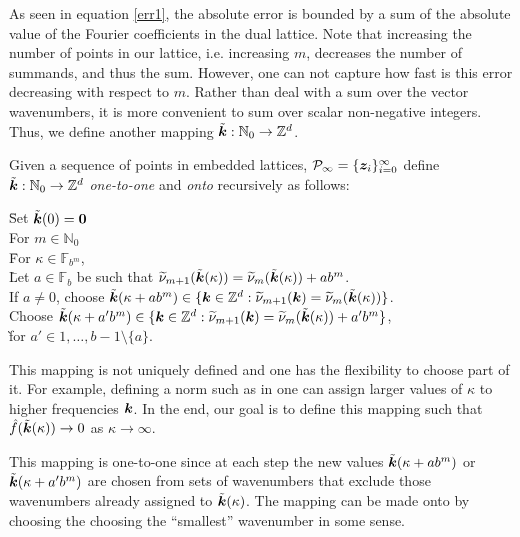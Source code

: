 \documentclass[graybox]{svmult}
\newcommand{\Z}{\mathbb{Z}} %
\newcommand{\N}{\mathbb{N}} %
\newcommand{\F}{\mathbb{F}} %
\newcommand{\bszero}{\boldsymbol{0}} %
\newcommand{\bsz}{\boldsymbol{z}}    %
\begin{document}
As seen in equation \eqref{err1}, the absolute error is bounded by a sum of the absolute value of the Fourier coefficients in the dual lattice. Note that increasing the number of points in our lattice, i.e. increasing $m$, decreases the number of summands, and thus the sum. However, one can not capture how fast is this error decreasing with respect to $m$.  Rather than deal with a sum over the vector wavenumbers, it is more convenient to sum over scalar non-negative integers.  Thus, we define another mapping $\tvk: \N_0 \to \Z^d$.

\begin{definition} \label{wavenummapdef} Given a sequence of points in embedded lattices, $\cp_{\infty} = \{\bsz_i\}_{i=0}^{\infty}$ define $\tvk: \N_0 \to \Z^d$ \emph{one-to-one} and \emph{onto} recursively as follows:
\begin{tabbing}
\hspace{0.5cm} \= Set $\tvk(0)=\bszero$ \+ \\
For $m\in \N_0$ \\
\hspace{0.3cm} \= For $\kappa \in \F_{b^m}$,  \+ \\
\hspace{0.3cm} \= Let $a\in \F_b$ be such that $\widetilde{\nu}_{m+1}(\tilde{\boldsymbol{k}}(\kappa))= \widetilde{\nu}_{m}(\tilde{\boldsymbol{k}}(\kappa)) + ab^m$. \+ \\
If $a\ne 0$, choose $\tvk(\kappa+a b^m) \in \{\bsk \in  \Z^d : \tnu_{m+1}(\bsk)=\tnu_{m}(\tvk(\kappa))\}$. \\
Choose $\tvk(\kappa+a' b^m) \in \{\bsk \in  \Z^d : \tnu_{m+1}(\bsk)=\tnu_{m}(\tvk(\kappa))+a' b^m \}$, \\ \` for  $a'\in {1, \ldots, b-1}\setminus \{a\}$.
\end{tabbing}
\end{definition}

This mapping is not uniquely defined and one has the flexibility to choose part of it. For example, defining a norm such as in \cite[Chap. 4]{SloJoe94} one can assign larger values of $\kappa$ to higher frequencies $\boldsymbol{k}$. In the end, our goal is to define this mapping such that $\hat{f}(\tilde{\boldsymbol{k}}(\kappa))\rightarrow 0$ as $\kappa \to \infty$.

This mapping is one-to-one since at each step the new values $\tilde{\boldsymbol{k}}(\kappa+a b^m)$ or $\tilde{\boldsymbol{k}}(\kappa+a' b^m)$ are chosen from sets of wavenumbers that exclude those wavenumbers already assigned to $\tilde{\boldsymbol{k}}(\kappa)$.  The mapping can be made onto by choosing the choosing the ``smallest'' wavenumber in some sense.
\end{document}
